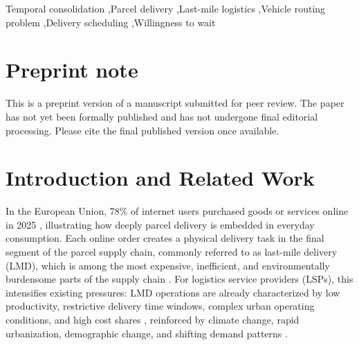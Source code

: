\documentclass[preprint,12pt,authoryear]{elsarticle}
\begin{document}
\begin{frontmatter}
\begin{abstract}
\end{abstract}


\begin{keyword}
Temporal consolidation \sep Parcel delivery \sep Last-mile logistics \sep Vehicle routing problem \sep Delivery scheduling \sep Willingness to wait






\end{keyword}
\end{frontmatter}

\section*{Preprint note}

This is a preprint version of a manuscript submitted for peer review. The paper has not yet been formally published and has not undergone final editorial processing. Please cite the final published version once available.


\section{Introduction and Related Work}
\label{intro}

In the European Union, $78\%$ of internet users purchased goods or services online in 2025 \citep{Eurostat2025}, illustrating how deeply parcel delivery is embedded in everyday consumption. Each online order creates a physical delivery task in the final segment of the parcel supply chain, commonly referred to as last-mile delivery (LMD), which is among the most expensive, inefficient, and environmentally burdensome parts of the supply chain \citep{Olsson2019}. For logistics service providers (LSPs), this intensifies existing pressures: LMD operations are already characterized by low productivity, restrictive delivery time windows, complex urban operating conditions, and high cost shares \citep{BACHOFNER2022100020}, reinforced by climate change, rapid urbanization, demographic change, and shifting demand patterns \citep{logistics2040025}.
\end{document}
